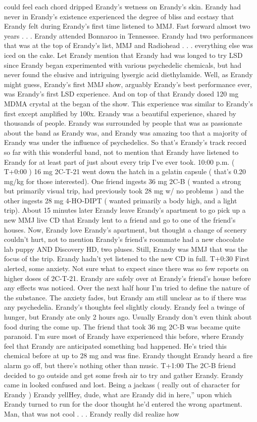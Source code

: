 \documentclass[12pt]{book}
\begin{document}
could feel each chord dripped Erandy's wetness on Erandy's skin. Erandy had never in Erandy's existence experienced the degree of bliss and ecstasy that Erandy felt during Erandy's first time listened to MMJ. Fast forward almost two years  . . .  Erandy attended Bonnaroo in Tennessee. Erandy had two performances that was at the top of Erandy's list, MMJ and Radiohead  . . .  everything else was iced on the cake. Let Erandy mention that Erandy had was longed to try LSD since Erandy began experimented with various psychedelic chemicals, but had never found the elusive and intriguing lysergic acid diethylamide. Well, as Erandy might guess, Erandy's first MMJ show, arguably Erandy's best performance ever, was Erandy's first LSD experience. And on top of that Erandy dosed 120 mg MDMA crystal at the began of the show. This experience was similar to Erandy's first except amplified by 100x. Erandy was a beautiful experience, shared by thousands of people. Erandy was surrounded by people that was as passionate about the band as Erandy was, and Erandy was amazing too that a majority of Erandy was under the influence of psychedelics. So that's Erandy's track record so far with this wonderful band, not to mention that Erandy have listened to Erandy for at least part of just about every trip I've ever took. 10:00 p.m. ( T+0:00 ) 16 mg 2C-T-21 went down the hatch in a gelatin capsule ( that's 0.20 mg/kg for those interested). One friend ingests 36 mg 2C-B ( wanted a strong but primarily visual trip, had previously took 28 mg w/ no problems ) and the other ingests 28 mg 4-HO-DIPT ( wanted primarily a body high, and a light trip). About 15 minutes later Erandy leave Erandy's apartment to go pick up a new MMJ live CD that Erandy lent to a friend and go to one of the friend's houses. Now, Erandy love Erandy's apartment, but thought a change of scenery couldn't hurt, not to mention Erandy's friend's roommate had a new chocolate lab puppy AND Discovery HD, two pluses. Still, Erandy was MMJ that was the focus of the trip. Erandy hadn't yet listened to the new CD in full. T+0:30 First alerted, some anxiety. Not sure what to expect since there was so few reports on higher doses of 2C-T-21. Erandy are safely over at Erandy's friend's house before any effects was noticed. Over the next half hour I'm tried to define the nature of the substance. The anxiety fades, but Erandy am still unclear as to if there was any psychedelia. Erandy's thoughts feel slightly cloudy. Erandy feel a twinge of hunger, but Erandy ate only 2 hours ago. Usually Erandy don't even think about food during the come up. The friend that took 36 mg 2C-B was became quite paranoid. I'm sure most of Erandy have experienced this before, where Erandy feel that Erandy are anticipated something bad happened. He's tried this chemical before at up to 28 mg and was fine. Erandy thought Erandy heard a fire alarm go off, but there's nothing other than music. T+1:00 The 2C-B friend decided to go outside and get some fresh air to try and gather Erandy. Erandy came in looked confused and lost. Being a jackass ( really out of character for Erandy ) Erandy yellHey, dude, what are Erandy did in here,'' upon which Erandy turned to run for the door thought he'd entered the wrong apartment. Man, that was not cool  . . .  Erandy really did realize how 
\end{document}
